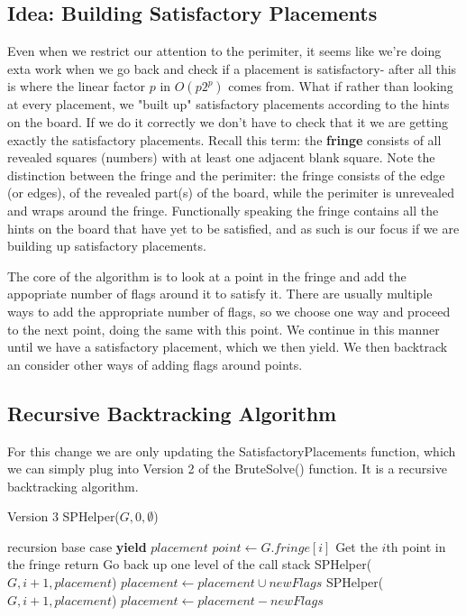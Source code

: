 \documentclass{article}
\theoremstyle{definition}
\theoremstyle{definition}
\theoremstyle{theorem}
\begin{document}
	\subsection*{Idea: Building Satisfactory Placements}
	Even when we restrict our attention to the perimiter, it seems like we're doing exta work when we go back and check if a placement is satisfactory- after all this is where the linear factor $p$ in $O(p2^{p})$ comes from. What if rather than looking at every placement, we "built up" satisfactory placements according to the hints on the board. If we do it correctly we don't have to check that it we are getting exactly the satisfactory placements. Recall this term: the \textbf{fringe} consists of all revealed squares (numbers) with at least one adjacent blank square. Note the distinction between the fringe and the perimiter: the fringe consists of the edge (or edges), of the revealed part(s) of the board, while the perimiter is unrevealed and wraps around the fringe. Functionally speaking the fringe contains all the hints on the board that have yet to be satisfied, and as such is our focus if we are building up satisfactory placements.
	
	The core of the algorithm is to look at a point in the fringe and add the appopriate number of flags around it to satisfy it. There are usually multiple ways to add the appropriate number of flags, so we choose one  way and proceed to the next point, doing the same with this point. We continue in this manner until we have a satisfactory placement, which we then yield. We then backtrack an consider other ways of adding flags around points.
	
	\subsection*{Recursive Backtracking Algorithm}
	For this change we are only updating the SatisfactoryPlacements function, which we can simply plug into Version 2 of the BruteSolve() function. It is a recursive backtracking algorithm.
	
	\begin{algorithmic}
		 \Comment Version 3
		\State SPHelper($G,0, \emptyset$)
		\EndFunction
		
		 \Comment recursion base case
		\State \textbf{yield} $placement$
		\EndIf
		\State $point \gets G.fringe[i]$ \Comment Get the $i$th point in the fringe
		\State return \Comment Go back up one level of the call stack
		\State SPHelper($G, i+1, placement$)
		\Else
		\State $placement \gets placement \cup newFlags$
		\State SPHelper($G, i+1, placement$)
		\State $placement \gets placement - newFlags$
		\EndFor
		\EndIf
		
		\EndFunction
	\end{algorithmic}
\end{document}
